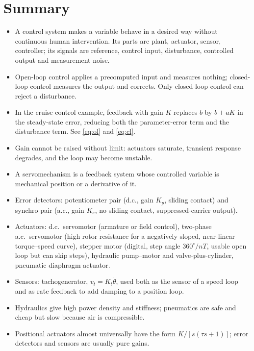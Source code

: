 \documentclass[11pt,a4paper]{article}
\begin{document}
\section*{Summary}

\begin{itemize}[leftmargin=*]
\item A control system makes a variable behave in a desired way without
      continuous human intervention. Its parts are plant, actuator, sensor,
      controller; its signals are reference, control input, disturbance,
      controlled output and measurement noise.
\item Open-loop control applies a precomputed input and measures nothing;
      closed-loop control measures the output and corrects. Only closed-loop
      control can reject a disturbance.
\item In the cruise-control example, feedback with gain $K$ replaces $b$ by
      $b+aK$ in the steady-state error, reducing both the parameter-error term
      and the disturbance term. See \eqref{eq:ol} and \eqref{eq:cl}.
\item Gain cannot be raised without limit: actuators saturate, transient
      response degrades, and the loop may become unstable.
\item A servomechanism is a feedback system whose controlled variable is
      mechanical position or a derivative of it.
\item Error detectors: potentiometer pair (d.c., gain $K_p$, sliding contact)
      and synchro pair (a.c., gain $K_s$, no sliding contact, suppressed-carrier
      output).
\item Actuators: d.c.\ servomotor (armature or field control), two-phase a.c.\
      servomotor (high rotor resistance for a negatively sloped, near-linear
      torque--speed curve), stepper motor (digital, step angle $360^\circ/nT$,
      usable open loop but can skip steps), hydraulic pump--motor and
      valve-plus-cylinder, pneumatic diaphragm actuator.
\item Sensors: tachogenerator, $v_t=K_t\dot\theta$, used both as the sensor of a
      speed loop and as rate feedback to add damping to a position loop.
\item Hydraulics give high power density and stiffness; pneumatics are safe and
      cheap but slow because air is compressible.
\item Positional actuators almost universally have the form $K/[s(\tau s+1)]$;
      error detectors and sensors are usually pure gains.
\end{itemize}
\end{document}
